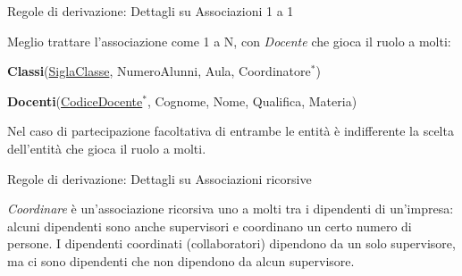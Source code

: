 \begin{frame}{Regole di derivazione: Dettagli su Associazioni 1 a 1}
\pause

Meglio trattare l'associazione come 1 a N, con \textit{Docente} che gioca il ruolo a molti:

\pause

\textbf{Classi}(\underline{SiglaClasse}, NumeroAlunni, Aula, Coordinatore$^*$)

\pause

\textbf{Docenti}(\underline{CodiceDocente}$^*$, Cognome, Nome, Qualifica, Materia)

\pause

Nel caso di partecipazione facoltativa di entrambe le entit\`a \`e indifferente  la scelta dell'entit\`a che gioca il ruolo a molti.
\end{frame}
%
\begin{frame}{Regole di derivazione: Dettagli su Associazioni ricorsive}
\vspace{-.5cm}
\begin{minipage}{0.9\textwidth}
\textit{Coordinare} \`e un'associazione ricorsiva uno a molti tra i dipendenti di un'impresa: alcuni dipendenti sono anche supervisori e coordinano un certo numero di persone. I dipendenti coordinati (collaboratori) dipendono da un solo supervisore, ma ci sono dipendenti che non dipendono da alcun supervisore.
\end{minipage}

\begin{center}
\end{center}
\end{frame}
